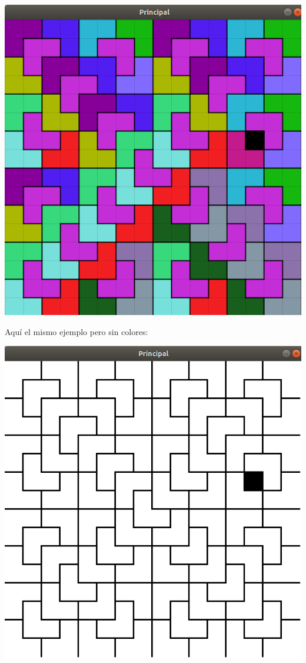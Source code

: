 \documentclass{article}
\begin{document}
\includegraphics[scale=0.4]{ejemplo2}

Aquí el mismo ejemplo pero sin colores:

\includegraphics[scale=0.4]{ejemplo3}
\end{document}
